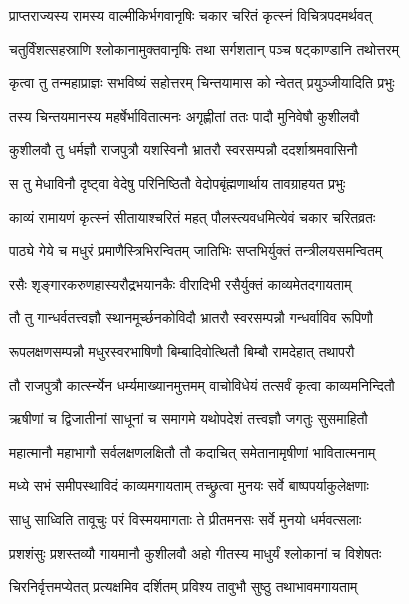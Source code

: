 
\twolineshloka
{प्राप्तराज्यस्य रामस्य वाल्मीकिर्भगवानृषिः}
{चकार चरितं कृत्स्नं विचित्रपदमर्थवत्} %

\twolineshloka
{चतुर्विंशत्सहस्राणि श्लोकानामुक्तवानृषिः}
{तथा सर्गशतान् पञ्च षट्काण्डानि तथोत्तरम्} %

\twolineshloka
{कृत्वा तु तन्महाप्राज्ञः सभविष्यं सहोत्तरम्}
{चिन्तयामास को न्वेतत् प्रयुञ्जीयादिति प्रभुः} %

\twolineshloka
{तस्य चिन्तयमानस्य महर्षेर्भावितात्मनः}
{अगृह्णीतां ततः पादौ मुनिवेषौ कुशीलवौ} %

\twolineshloka
{कुशीलवौ तु धर्मज्ञौ राजपुत्रौ यशस्विनौ}
{भ्रातरौ स्वरसम्पन्नौ ददर्शाश्रमवासिनौ} %

\twolineshloka
{स तु मेधाविनौ दृष्ट्वा वेदेषु परिनिष्ठितौ}
{वेदोपबृंह्मणार्थाय तावग्राहयत प्रभुः} %

\twolineshloka
{काव्यं रामायणं कृत्स्नं सीतायाश्चरितं महत्}
{पौलस्त्यवधमित्येवं चकार चरितव्रतः} %

\twolineshloka
{पाठ्ये गेये च मधुरं प्रमाणैस्त्रिभिरन्वितम्}
{जातिभिः सप्तभिर्युक्तं तन्त्रीलयसमन्वितम्} %

\twolineshloka
{रसैः शृङ्गारकरुणहास्यरौद्रभयानकैः}
{वीरादिभी रसैर्युक्तं काव्यमेतदगायताम्} %

\twolineshloka
{तौ तु गान्धर्वतत्त्वज्ञौ स्थानमूर्च्छनकोविदौ}
{भ्रातरौ स्वरसम्पन्नौ गन्धर्वाविव रूपिणौ} %

\twolineshloka
{रूपलक्षणसम्पन्नौ मधुरस्वरभाषिणौ}
{बिम्बादिवोत्थितौ बिम्बौ रामदेहात् तथापरौ} %

\twolineshloka
{तौ राजपुत्रौ कार्त्स्न्येन धर्म्यमाख्यानमुत्तमम्}
{वाचोविधेयं तत्सर्वं कृत्वा काव्यमनिन्दितौ} %

\twolineshloka
{ऋषीणां च द्विजातीनां साधूनां च समागमे}
{यथोपदेशं तत्त्वज्ञौ जगतुः सुसमाहितौ} %

\twolineshloka
{महात्मानौ महाभागौ सर्वलक्षणलक्षितौ}
{तौ कदाचित् समेतानामृषीणां भावितात्मनाम्} %

\twolineshloka
{मध्ये सभं समीपस्थाविदं काव्यमगायताम्}
{तच्छ्रुत्वा मुनयः सर्वे बाष्पपर्याकुलेक्षणाः} %

\twolineshloka
{साधु साध्विति तावूचुः परं विस्मयमागताः}
{ते प्रीतमनसः सर्वे मुनयो धर्मवत्सलाः} %

\twolineshloka
{प्रशशंसुः प्रशस्तव्यौ गायमानौ कुशीलवौ}
{अहो गीतस्य माधुर्यं श्लोकानां च विशेषतः} %

\twolineshloka
{चिरनिर्वृत्तमप्येतत् प्रत्यक्षमिव दर्शितम्}
{प्रविश्य तावुभौ सुष्ठु तथाभावमगायताम्} %

